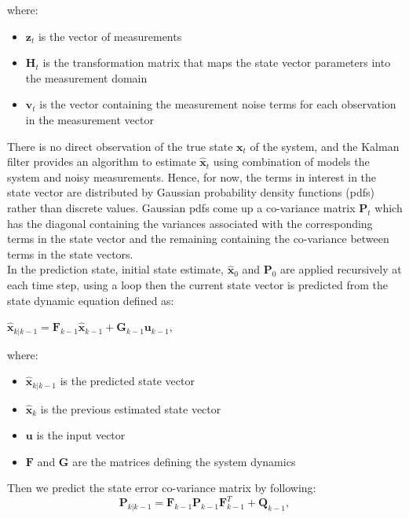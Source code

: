 \hspace{0.5cm}where:
\begin{itemize}
    \item $\textbf{z}_t$ is the vector of measurements
    \item $\textbf{H}_t$ is the transformation matrix that maps the state vector parameters into the measurement domain
    \item $\textbf{v}_t$ is the vector containing the measurement noise terms for each observation in the measurement vector
\end{itemize}\par
There is no direct observation of the true state $\textbf{x}_t$ of the system, and the Kalman filter provides an algorithm to estimate $\hat{\textbf{x}}_t$ using combination of models the system and noisy measurements. Hence, for now, the terms in interest in the state vector are distributed by Gaussian probability density functions (pdfs) rather than discrete values. Gaussian pdfs come up a co-variance matrix $\textbf{P}_t$ which has the diagonal containing the variances associated with the corresponding terms in the state vector and the remaining containing the co-variance between terms in the state vectors.\\
In the prediction state, initial state estimate, $\hat{\textbf{x}}_0$ and $\textbf{P}_0$ are applied recursively at each time step, using a loop then the current state vector is predicted from the state dynamic equation defined as:
\begin{center}
    $
        \hat{\textbf{x}}_{k|k-1} = \textbf{F}_{k-1}\hat{\textbf{x}}_{k-1} + \textbf{G}_{k-1}\textbf{u}_{k-1}, 
    $
\end{center}
\hspace{0.5cm}where:
\begin{itemize}
    \item $\hat{\textbf{x}}_{k|k-1}$ is the predicted state vector
    \item $\hat{\textbf{x}}_{k}$ is the previous estimated state vector
    \item $\textbf{u}$ is the input vector
    \item $\textbf{F}$ and $\textbf{G}$ are the matrices defining the system dynamics
\end{itemize}
\pagebreak
\hspace{0.5cm}Then we predict the state error co-variance matrix by following:
\begin{equation}
          \textbf{P}_{k|k-1} = \textbf{F}_{k-1}\textbf{P}_{k-1}\textbf{F}^T_{k-1} + \textbf{Q}_{k-1}, 
\end{equation}


